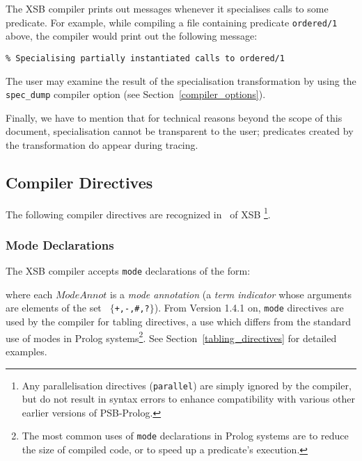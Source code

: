 The XSB compiler prints out messages whenever it specialises
calls to some predicate.  For example, while compiling a file
containing predicate {\tt ordered/1} above, the compiler would print
out the following message:
\begin{center}
{\tt	\% Specialising partially instantiated calls to ordered/1}
\end{center}
The user may examine the result of the specialisation transformation
by using the {\tt spec\_dump} compiler option
(see Section~\ref{compiler_options}).

Finally, we have to mention that for technical reasons beyond the scope of
this document, specialisation cannot be transparent to the user; predicates
created by the transformation do appear during tracing.


\subsection{Compiler Directives}\label{compiler_directives}

The following compiler directives are recognized in \version\ of XSB
\footnote{Any parallelisation directives ({\tt parallel}) are simply
ignored by the compiler, but do not result in syntax errors to enhance
compatibility with various other earlier versions of PSB-Prolog.}.

\subsubsection{Mode Declarations}\label{mode_declarations}

The XSB compiler accepts {\tt mode} declarations of the form:


\noindent
where each $ModeAnnot$ is a {\em mode annotation\/} (a {\em term
indicator\/} whose arguments are elements of the set {\tt
$\{$+,-,\#,?$\}$}).  From Version 1.4.1 on, {\tt mode} directives are
used by the compiler for tabling directives, a use which differs from
the standard use of modes in Prolog systems\footnote{The most common
uses of {\tt mode} declarations in Prolog systems are to reduce the
size of compiled code, or to speed up a predicate's execution.}.  See
Section~\ref{tabling_directives} for detailed examples.

